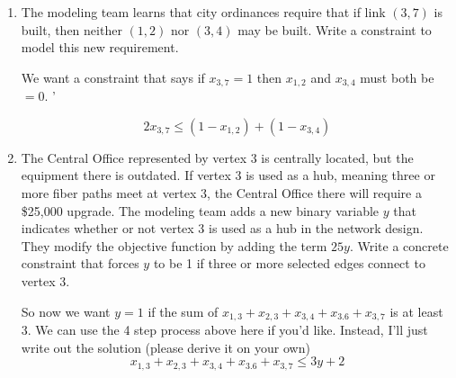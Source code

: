 \documentclass[letterpaper,oneside,12pt]{article}%
\newcommand{\blu}{\color{blue}}
\begin{document}
\begin{enumerate}
\begin{enumerate}
\begin{enumerate}
{There are an exponential number of these constraints, if we add them all at the beginning the size of the problem will explode and it will not be solvable.
}
\item  Sketch a non-spanning-tree solution that is possible if these constraints are not included, and write out the constraint of this type that you would need to add to prevent this subgraph from occuring in the next iteration.

{
\blu

There's many examples. Suppose you get the solution 1-2-3-4 and 5-6-7 which results in 2 cycles. This solution satisfies the other constraints of the problem. You can eliminate this by writing:

Let $S_1 = \{1,2,3,4\}$\\
Let $S_2 = \{5,6,7\}$\\

Then including the constraint
\[
\sum_{(i,j) \in E: i \in S, j \in S} x_{i,j} \leq |S| - 1
\] for each of the two sets.

}

\end{enumerate}
\item The modeling team learns that city ordinances require that if link $(3,7)$ is built, then neither $(1,2)$ nor $(3,4)$ may be built.  Write a constraint to model this new requirement.

{
\blu

We want a constraint that says if $x_{3,7} = 1$ then $x_{1,2}$ and $x_{3,4} $ must both be $=0$. '

\[
2x_{3,7}  \leq (1-x_{1,2}) + (1-x_{3,4})
\]

}

\item The Central Office represented by vertex 3 is centrally located, but the equipment there is outdated.  If vertex 3 is used as a hub, meaning three or more fiber paths meet at vertex 3, the Central Office there will require a \$25,000 upgrade.  The modeling team adds a new binary variable $y$ that indicates whether or not vertex 3 is used as a hub in the network design.  They modify the objective function by adding the term $25y$.  Write a concrete constraint that forces $y$ to be 1 if three or more selected edges connect to vertex 3.

{
\blu

So now we want $y = 1$ if the sum of $x_{1,3} + x_{2,3} + x_{3,4} + x_{3.6} + x_{3,7}$ is at least 3. We can use the 4 step process above here if you'd like. Instead, I'll just write out the solution (please derive it on your own)
\[
x_{1,3} + x_{2,3} + x_{3,4} + x_{3.6} + x_{3,7} \leq 3 y+2
\]

}
\end{enumerate}
\end{enumerate}
\end{document}
